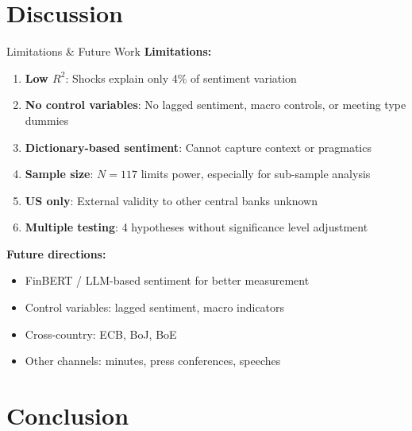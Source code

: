 \documentclass[aspectratio=169, 11pt]{beamer}
\begin{document}
\section{Discussion}

\begin{frame}{Limitations \& Future Work}
\textbf{Limitations:}
\begin{enumerate}
  \item \textbf{Low $R^2$}: Shocks explain only 4\% of sentiment variation
  \item \textbf{No control variables}: No lagged sentiment, macro controls, or meeting type dummies
  \item \textbf{Dictionary-based sentiment}: Cannot capture context or pragmatics
  \item \textbf{Sample size}: $N = 117$ limits power, especially for sub-sample analysis
  \item \textbf{US only}: External validity to other central banks unknown
  \item \textbf{Multiple testing}: 4 hypotheses without significance level adjustment
\end{enumerate}

\vspace{0.5em}
\textbf{Future directions:}
\begin{itemize}
  \item FinBERT / LLM-based sentiment for better measurement
  \item Control variables: lagged sentiment, macro indicators
  \item Cross-country: ECB, BoJ, BoE
  \item Other channels: minutes, press conferences, speeches
\end{itemize}
\end{frame}

\section{Conclusion}
\end{document}
